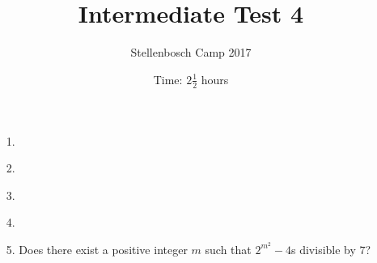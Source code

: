\documentclass[12pt]{article}
\title{Intermediate Test 4}
\author{Stellenbosch Camp 2017}
\date{Time: $2\frac{1}{2}$ hours}
\begin{document}
 \maketitle

\begin{enumerate}

\item[1.] %


\item[2.] %


\item[3.] %


\item[4.] %
 

\item[5.] %
Does there exist a positive integer $m$ such that $2^{m^2} - 4$s divisible by $7$?


\end{enumerate}
\end{document}
